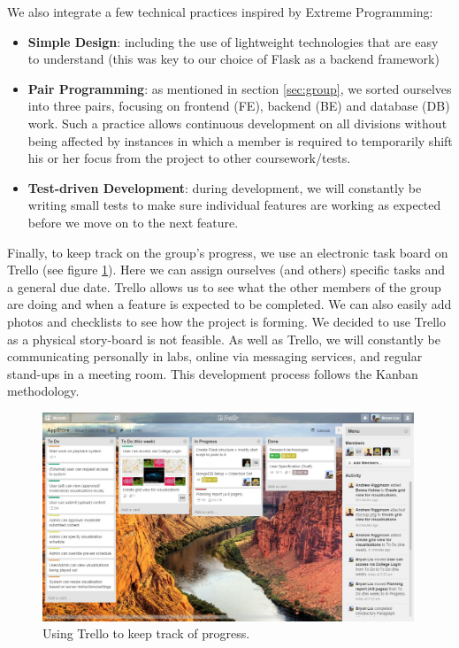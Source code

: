 \documentclass[a4paper]{article}
\begin{document}
We also integrate a few technical practices inspired by Extreme Programming:
\begin{itemize}
  \item \textbf{Simple Design}: including the use of lightweight technologies that are easy to understand (this was key to our choice of Flask as a backend framework)
  \item \textbf{Pair Programming}: as mentioned in section \ref{sec:group}, we sorted
        ourselves into three pairs, focusing on frontend (FE), backend (BE) and database (DB) work.
        Such a practice allows continuous development on all divisions without
        being affected by instances in which a member is required to temporarily shift his or her
        focus from the project to other coursework/tests.
  \item \textbf{Test-driven Development}: during development, we will constantly be writing small tests to make sure individual features are working as expected before we move on to the next feature.

\end{itemize} 

Finally, to keep track on the group's progress, we use an electronic task
board on Trello (see figure \ref{fig:trello}). Here we can assign ourselves (and others) specific tasks and a general due date. Trello allows us to see what the other members of the group are doing and when a feature is expected to be completed. We can also easily add photos and checklists to see how the project is forming. We decided to use Trello as a physical story-board is not feasible. As well as Trello, we will constantly be communicating personally in labs, online via messaging services, and regular stand-ups in a meeting room. This development process follows the Kanban methodology.

\begin{figure}[ht]
  \centering
    \includegraphics[width = 0.99\textwidth]{./planning/trello.jpg}
   
  \caption{Using Trello to keep track of progress.}
  \label{fig:trello}
\end{figure}
\end{document}
